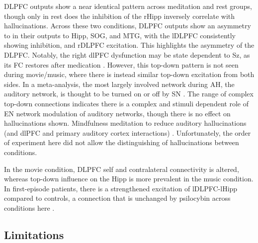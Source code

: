 \documentclass{article}
\begin{document}
DLPFC outputs show a near identical pattern across meditation and rest groups, though only in rest does the inhibition of the rHipp inversely correlate with hallucinations. Across these two conditions, DLPFC outputs show an asymmetry to in their outputs to Hipp, SOG, and MTG, with the lDLPFC consistently showing inhibition, and rDLPFC excitation. This highlights the asymmetry of the DLPFC. Notably, the right dlPFC dysfunction may be state dependent to Sz, as its FC restores after medication \citep{sarpal_antipsychotic_2015}. However, this top-down pattern is not seen during movie/music, where there is instead similar top-down excitation from both sides. In a meta-analysis, the most largely involved network during AH, the auditory network, is thought to be turned on or off by SN \citep{mo_network_2024}. The range of complex top-down connections indicates there is a complex and stimuli dependent role of EN network modulation of auditory networks, though there is no effect on hallucinations shown. Mindfulness meditation to reduce auditory hallucinations (and dlPFC and primary auditory cortex interactions) \citep{bauer_real-time_2025}. Unfortunately, the order of experiment here did not allow the distinguishing of hallucinations between conditions. 

In the movie condition, DLPFC self and contralateral connectivity is altered, whereas top-down influence on the Hipp is more prevalent in the music condition. In first-episode patients, there is a strengthened excitation of lDLPFC-lHipp compared to controls, a connection that is unchanged by psilocybin across conditions here \citep{cui_anterior_2015}. 

\subsection{Limitations}
\end{document}
